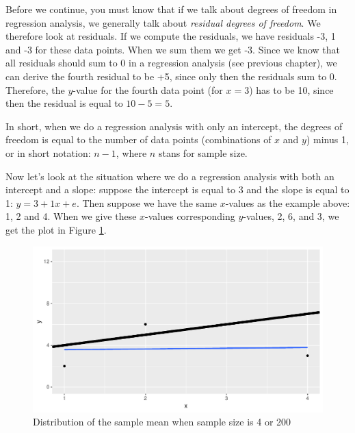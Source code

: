 \documentclass[]{report}\usepackage[]{graphicx}\usepackage[]{color}
\makeatletter
\def\maxwidth{ %
  \ifdim\Gin@nat@width>\linewidth
    \linewidth
  \else
    \Gin@nat@width
  \fi
}
\newenvironment{knitrout}{}{} %
\makeatother
\begin{document}
Before we continue, you must know that if we talk about degrees of freedom in regression analysis, we generally talk about \textit{residual degrees of freedom}. We therefore look at residuals. If we compute the residuals, we have residuals -3, 1 and -3 for these data points. When we sum them we get -3. Since we know that all residuals should sum to 0 in a regression analysis (see previous chapter), we can derive the fourth residual to be +5, since only then the residuals sum to 0. Therefore, the $y$-value for the fourth data point (for $x=3$) has to be 10, since then the residual is equal to $10-5=5$.

In short, when we do a regression analysis with only an intercept, the degrees of freedom is equal to the number of data points (combinations of $x$ and $y$) minus 1, or in short notation: $n-1$, where $n$ stans for sample size.

Now let's look at the situation where we do a regression analysis with both an intercept and a slope: suppose the intercept is equal to 3 and the slope is equal to 1: $y=3+1 x+e$. Then suppose we have the same $x$-values as the example above: 1, 2 and 4. When we give these $x$-values corresponding $y$-values, 2, 6, and 3, we get the plot in Figure \ref{fig:inf_12}.

\begin{knitrout}
\color{fgcolor}\begin{figure}

{\centering \includegraphics[width=\maxwidth]{figure/inf_12-1} 

}

\caption[Distribution of the sample mean when sample size is 4 or 200]{Distribution of the sample mean when sample size is 4 or 200}\label{fig:inf_12}
\end{figure}


\end{knitrout}
\end{document}
